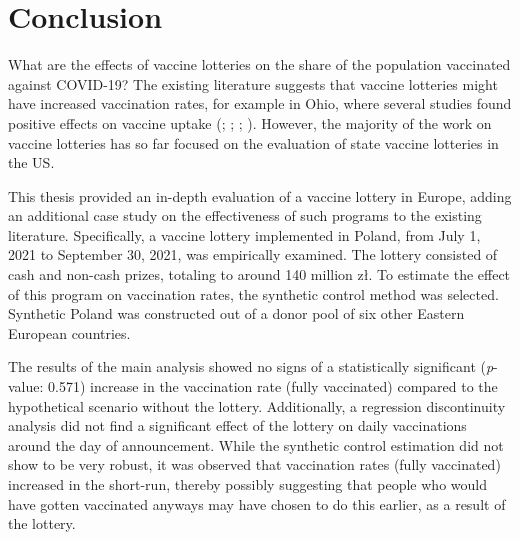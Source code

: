 \documentclass{scrbook}
\begin{document}
\chapter{Conclusion}

What are the effects of vaccine lotteries on the share of the population
vaccinated against COVID-19? The existing literature suggests that
vaccine lotteries might have increased vaccination rates, for example in
Ohio, where several studies found positive effects on vaccine uptake
(\cite{mallow_covid-19_2022}; \cite{brehm_ohio_2022};
\cite{barber_conditional_2022}; \cite{sehgal_impact_2021}). However, the
majority of the work on vaccine lotteries has so far focused on the
evaluation of state vaccine lotteries in the US.

This thesis provided an in-depth evaluation of a vaccine lottery in
Europe, adding an additional case study on the effectiveness of such
programs to the existing literature. Specifically, a vaccine lottery
implemented in Poland, from July 1, 2021 to September 30, 2021, was
empirically examined. The lottery consisted of cash and non-cash prizes,
totaling to around 140 million zł. To estimate the effect of this
program on vaccination rates, the synthetic control method was selected.
Synthetic Poland was constructed out of a donor pool of six other
Eastern European countries.

The results of the main analysis showed no signs of a statistically
significant (\textit{p}-value: 0.571) increase in the vaccination rate
(fully vaccinated) compared to the hypothetical scenario without the
lottery. Additionally, a regression discontinuity analysis did not find
a significant effect of the lottery on daily vaccinations around the day
of announcement. While the synthetic control estimation did not show to
be very robust, it was observed that vaccination rates (fully
vaccinated) increased in the short-run, thereby possibly suggesting that
people who would have gotten vaccinated anyways may have chosen to do
this earlier, as a result of the lottery.
\end{document}
